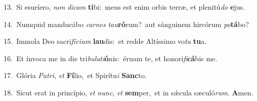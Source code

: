 {\numbfont\textcolor{\numbcolor}{13.}}~Si esuríero, \textit{non} \textit{di}\-\textit{cam} \textbf{ti}\-bi:~\star meus est enim orbis terræ, et plenitú\textit{do} \textbf{e}\-jus.\par
{\numbfont\textcolor{\numbcolor}{14.}}~Numquid manducábo \textit{car}\-\textit{nes} \textit{tau}\-\textbf{ró}rum?~\star aut sánguinem hircórum \textit{po}\-\textbf{tá}bo?\par
{\numbfont\textcolor{\numbcolor}{15.}}~Immola Deo sacri\-\textit{fí}\-\textit{ci}\textit{um} \textbf{lau}\-dis:~\star et redde Altíssimo vo\textit{ta} \textbf{tu}\-a.\par
{\numbfont\textcolor{\numbcolor}{16.}}~Et ínvoca me in die tri\-\textit{bu}\-\textit{la}\textit{ti}\textbf{ó}nis:~\star éruam te, et honori\-\textit{fi}\-\textbf{cá}bis me.\par
{\numbfont\textcolor{\numbcolor}{17.}}~Glória \textit{Pa}\-\textit{tri}, \textit{et} \textbf{Fí}\-lio,~\star et Spirítu\textit{i} \textbf{Sanc}\-to.\par
{\numbfont\textcolor{\numbcolor}{18.}}~Sicut erat in princípio, \textit{et} \textit{nunc}\-, \textit{et} \textbf{sem}\-per,~\star et in sǽcula sæculó\-\textit{rum}\-. \textbf{A}\-men.\par
